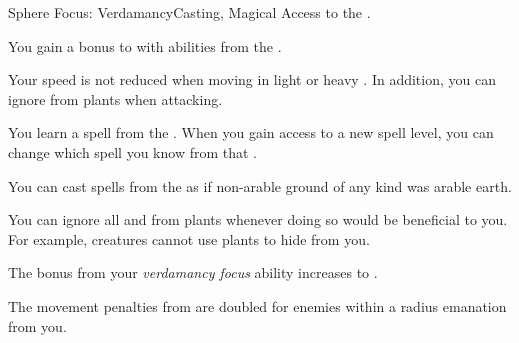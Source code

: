     \begin{feat}{Sphere Focus: Verdamancy}{Casting, Magical}
        \featpre Access to the  .

         You gain a  bonus to  with abilities from the  .

         Your speed is not reduced when moving in light or heavy .
        In addition, you can ignore  from plants when attacking.

         You learn a spell from the  .
        When you gain access to a new spell level, you can change which spell you know from that .

         You can cast spells from the   as if non-arable ground of any kind was arable earth.

         You can ignore all  and  from plants whenever doing so would be beneficial to you.
        For example, creatures cannot use plants to hide from you.

         The bonus from your \textit{verdamancy focus} ability increases to .

         The movement penalties from  are doubled for enemies within a \areahuge radius emanation from you.
    \end{feat}

